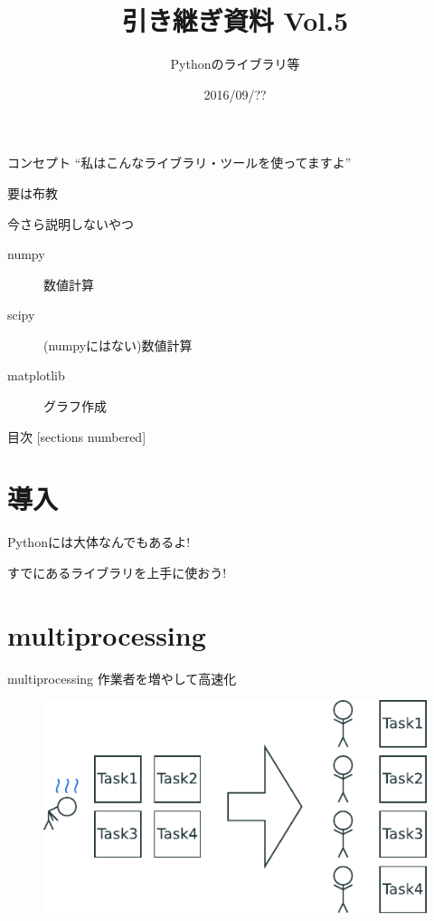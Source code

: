 \documentclass[12pt, xetex, xcolor=pdftex, dvipsnames]{beamer}
\title{引き継ぎ資料 Vol.5}
\subtitle{Pythonのライブラリ等}
\date{2016/09/??}
\author{}
\institute{}
\begin{document}
\maketitle
\begin{frame}{コンセプト}
    ``私はこんなライブラリ・ツールを使ってますよ''

    要は布教
\end{frame}
\begin{frame}{今さら説明しないやつ}
    \begin{description}
        \item[numpy] 数値計算
        \item[scipy] (numpyにはない)数値計算
        \item[matplotlib] グラフ作成
    \end{description}
\end{frame}
\begin{frame}{目次}
  [sections numbered]
  \tableofcontents[hideallsubsections]
\end{frame}
\section{導入}
\begin{frame}
    Pythonには大体なんでもあるよ!
\end{frame}
\begin{frame}
    すでにあるライブラリを上手に使おう!
\end{frame}

\section{multiprocessing}
\begin{frame}{multiprocessing}
    作業者を増やして高速化

    \begin{figure}
        \centering
        \includegraphics{img/multitask.pdf}
    \end{figure}
\end{frame}
\end{document}
